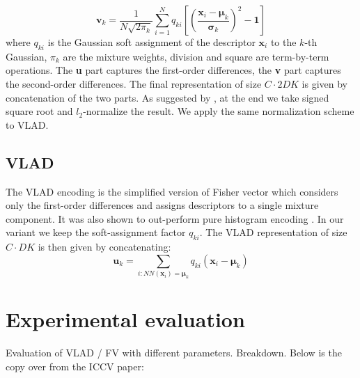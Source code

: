 \documentclass[10pt,twocolumn,letterpaper]{article}
\begin{document}
\begin{equation}
\label{eq:fv_vk}
\textbf{v}_k=\frac{1}{N\sqrt{2\pi_k}}\sum_{i=1}^{N}q_{ki}\left[\left(\frac{\textbf{x}_i-\boldsymbol\mu_k}{\boldsymbol\sigma_k}\right)^2-\textbf{1}\right]
\end{equation}
where $q_{ki}$ is the Gaussian soft assignment of the descriptor $\textbf{x}_i$ to the $k$-th Gaussian, $\pi_k$ are the mixture weights, division and square are term-by-term operations. The \textbf{u} part captures the first-order differences, the \textbf{v} part captures the second-order differences. The final representation of size $C\cdot 2DK$ is given by concatenation of the two parts. As suggested by \cite{Perronnin10}, at the end we take signed square root and $l_2$-normalize the result. We apply the same normalization scheme to VLAD.
\subsection{VLAD}
The VLAD encoding is the simplified version of Fisher vector which considers only the first-order differences and assigns descriptors to a single mixture component. It was also shown to out-perform pure histogram encoding \cite{Jegou12}. In our variant we keep the soft-assignment factor $q_{ki}$. The VLAD representation of size $C\cdot DK$ is then given by concatenating:$$\textbf{u}_k=\sum_{i : NN\left(\textbf{x}_i\right)=\boldsymbol\mu_k}q_{ki}\left(\textbf{x}_i -\boldsymbol\mu_k\right)$$



\section{Experimental evaluation}
\label{sec:experiments}
Evaluation of VLAD / FV with different parameters. Breakdown.
Below is the copy over from the ICCV paper:
\end{document}
